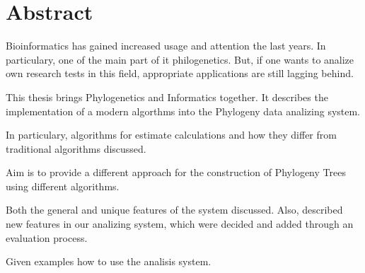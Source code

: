 \chapter*{Abstract} 
Bioinformatics has gained increased usage and attention the last years.
In particulary, one of the main part of it philogenetics. 
But, if one wants to analize own research tests in this field, appropriate applications 
are still lagging behind.

This thesis brings Phylogenetics and Informatics together. 
It describes the implementation of a modern algorthms
into the Phylogeny data analizing system. 

In particulary, algorithms for estimate calculations \cite{kamilov} and how they
differ from traditional algorithms discussed.

Aim is to provide a different approach for the 
construction of Phylogeny Trees using different algorithms.\cite{juravlyov}

Both the general and unique features of the system discussed. Also, 
described new features in our analizing system, which were decided 
and added through an evaluation process.

Given examples how to use the analisis system.\par

\vspace{10mm}


